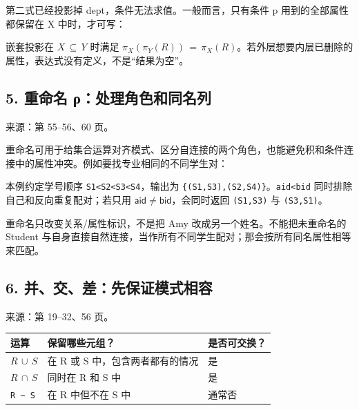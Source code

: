 
第二式已经投影掉 dept，条件无法求值。一般而言，只有条件 p 用到的全部属性都保留在 X 中时，才可写：


嵌套投影在 \(X\,\subseteq \,Y\) 时满足 \(\pi _{X}(\pi _{Y}(R))\,=\,\pi _{X}(R)\)。若外层想要内层已删除的属性，表达式没有定义，不是``结果为空''。

\subsection{5. 重命名 ρ：处理角色和同名列}\label{05_relational_algebra_zh-ux91cdux547dux540d-ux3c1ux5904ux7406ux89d2ux8272ux548cux540cux540dux5217}

来源：第 55--56、60 页。

重命名可用于给集合运算对齐模式、区分自连接的两个角色，也能避免积和条件连接中的属性冲突。例如要找专业相同的不同学生对：


本例约定学号顺序 \texttt{S1\textless{}S2\textless{}S3\textless{}S4}，输出为 \texttt{\{(S1,S3),(S2,S4)\}}。\texttt{aid\textless{}bid} 同时排除自己和反向重复配对；若只用 \(\mathsf{aid}\ne \mathsf{bid}\)，会同时返回 \texttt{(\allowbreak{}S1,\allowbreak{}S3)\allowbreak{}} 与 \texttt{(\allowbreak{}S3,\allowbreak{}S1)\allowbreak{}}。

重命名只改变关系/属性标识，不是把 Amy 改成另一个姓名。不能把未重命名的 Student 与自身直接自然连接，当作所有不同学生配对；那会按所有同名属性相等来匹配。

\subsection{6. 并、交、差：先保证模式相容}\label{05_relational_algebra_zh-ux5e76ux4ea4ux5deeux5148ux4fddux8bc1ux6a21ux5f0fux76f8ux5bb9}

来源：第 19--32、56 页。

\begin{longtable}[]{@{}lll@{}}
\toprule\noalign{}
运算 & 保留哪些元组？ & 是否可交换？ \\
\midrule\noalign{}
\endhead
\bottomrule\noalign{}
\endlastfoot
\(R\,\cup \,S\) & 在 R 或 S 中，包含两者都有的情况 & 是 \\
\(R\,\cap \,S\) & 同时在 R 和 S 中 & 是 \\
\texttt{R\ −\ S} & 在 R 中但不在 S 中 & 通常否 \\
\end{longtable}


